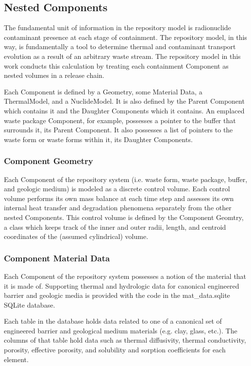 \subsection{Nested Components}

The fundamental unit of information in the repository model is radionuclide 
contaminant presence at each stage of containment.  The repository model, in 
this way, is fundamentally a tool to determine thermal and contaminant 
transport evolution as a result of an arbitrary waste stream. The repository 
model in this work conducts this calculation by  treating each containment 
Component as nested volumes in a release chain. 

Each Component is defined by a Geometry, some Material Data, a ThermalModel, 
and a NuclideModel. It is also defined by the Parent Component which contains 
it and the Daughter Components which it contains. An emplaced waste package 
Component, for example, possesses a pointer to the buffer that surrounds it, 
its Parent Component. It also possesses a list of pointers to the waste form or 
waste forms within it, its Daughter Components. 

\subsubsection{Component Geometry}

Each Component of the repository system (i.e. waste form, waste package, buffer, 
and geologic medium) is modeled as a discrete control volume. Each control 
volume performs its own mass balance at each time step and assesses its own 
internal  heat transfer and degradation phenomena separately from the other 
nested Components. This control volume is defined by the Component Geomtry, 
a class which keeps track of the inner and outer radii, length, and centroid 
coordinates of the (assumed cylindrical) volume.

\subsubsection{Component Material Data}

Each Component of the repository system possesses a notion of the material that 
it is made of. Supporting thermal and hydrologic data for canonical engineered 
barrier and geologic media is provided with the code in the 
mat\_data.sqlite SQLite database.

Each table in the database holds data related to one of a canonical set of 
engineered barrier and geological medium materials (e.g. clay, glass, etc.).  
The columns of that table hold data such as thermal diffusivity, thermal 
conductivity, porosity, effective porosity, and solubility and sorption 
coefficients for each element.  

